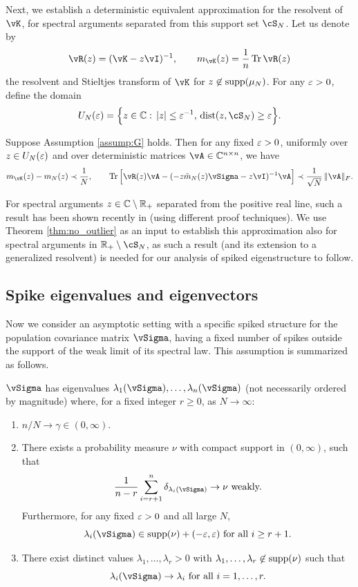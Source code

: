 Next, we establish a deterministic equivalent approximation for the resolvent of
$\vK$, for spectral arguments separated from this support set $\cS_N$.
Let us denote by
\[\vR(z)=(\vK-z\vI)^{-1}, \qquad
m_{\vK}(z)=\frac{1}{n} \Tr \vR(z)\]
the resolvent and Stieltjes transform of $\vK$ for $z\not\in\mathrm{supp}({\mu_N})$.
For any $\varepsilon>0$, define the domain
\begin{equation}\label{eq:U_e}
U_N(\eps)=\Big\{z \in \C:\,|z| \leq \eps^{-1},\,
\dist{z,\cS_N} \geq \eps\Big\}.
\end{equation}

\begin{theorem}\label{thm:deterministic_equ}
Suppose Assumption \ref{assump:G} holds. Then for any fixed $\varepsilon>0$,
uniformly over $z \in U_N(\varepsilon)$ and over deterministic matrices
$\vA \in \C^{n \times n}$, we have
\[m_{\vK}(z)-m_N(z) \prec \frac{1}{N},
\qquad \Tr \Big[\vR(z)\vA-(-z\tilde m_N(z)\vSigma-z\vI)^{-1}\vA\Big]
\prec \frac{1}{\sqrt{N}}\,\|\vA\|_F.\]
\end{theorem}
For spectral arguments $z \in \mathbb{C} \setminus \mathbb{R}_+$ separated from the positive
real line, such a result has been shown recently in
\cite{chouard2022quantitative,schroder2023deterministic} (using different proof
techniques). We use Theorem \ref{thm:no_outlier} as an input to establish this
approximation also for spectral arguments in $\R_+ \setminus \cS_N$, as such a
result (and its extension to a generalized resolvent) is needed
for our analysis of spiked eigenstructure to follow.

\subsection{Spike eigenvalues and eigenvectors}\label{subsec:spikes}

Now we consider an asymptotic setting with a specific spiked structure for the
population covariance matrix $\vSigma$, having a fixed number of spikes outside the
support of the weak limit of its spectral law.
This assumption is summarized as follows.

\begin{assumption}\label{assum:spike}
$\vSigma$ has eigenvalues $\lambda_1(\vSigma),\ldots,\lambda_n(\vSigma)$ (not
necessarily ordered by magnitude) where,
for a fixed integer $r \geq 0$, as $N \to \infty$:
\begin{enumerate}[label=(\alph*)]
\item $n/N \to \gamma \in (0,\infty)$.
\item There exists a probability measure $\nu$ with compact support in
$(0,\infty)$, such that
\[\frac{1}{n-r}\sum_{i=r+1}^n \delta_{\lambda_i(\vSigma)} \to \nu \text{
weakly.}\]
Furthermore, for any fixed $\varepsilon>0$ and all large $N$,
\[\lambda_i(\vSigma) \in \supp{\nu}+(-\eps,\eps) \text{ for all }
i \geq r+1.\]
\item There exist distinct values $\lambda_1,\ldots,\lambda_r>0$ with
$\lambda_1,\ldots,\lambda_r \not\in\mathrm{supp}({\nu})$ such that
\[\lambda_i(\vSigma) \to \lambda_i \text{ for all } i=1,\ldots,r.\]
\end{enumerate}
\end{assumption}

